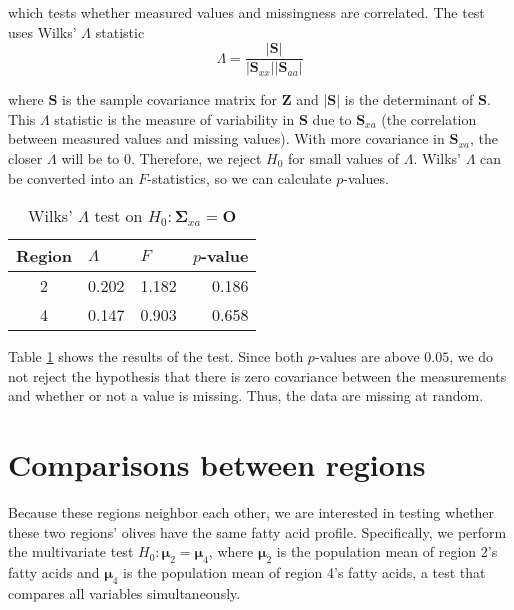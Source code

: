 \documentclass[11pt]{article}
\newcommand{\m}[1]{\mathbf{\bm{#1}}}
\begin{document}
\noindent which tests whether measured values and missingness are correlated. The test uses Wilks' $\Lambda$ statistic
\vspace{-3mm}
\[\Lambda=\frac{|\m{S}|}{|\m{S}_{xx}||\m{S}_{aa}|}\]
\vspace{-6mm}

\noindent where $\m{S}$ is the sample covariance matrix for $\m{Z}$ and $|\m{S}|$ is the determinant of $\m{S}$. This $\Lambda$ statistic is the measure of variability in $\m{S}$ due to $\m{S}_{xa}$ (the correlation between measured values and missing values). With more covariance in $\m{S}_{xa}$, the closer $\Lambda$ will be to $0$. Therefore, we reject $H_0$ for small values of $\Lambda$. Wilks' $\Lambda$ can be converted into an $F$-statistics, so we can calculate $p$-values.

\begin{table}[ht]
\begin{center}
\begin{tabular}{c | rrr}
Region & \multicolumn{1}{l}{$\Lambda$}  & \multicolumn{1}{l}{$F$}    & \multicolumn{1}{l}{$p$-value} \\ \hline \hline
     2 & 0.202 & 1.182  & 0.186     \\
     4 & 0.147 & 0.903  & 0.658     \\
\end{tabular}
\caption{Wilks' $\Lambda$ test on $H_0:\m{\Sigma}_{xa}=\m{O}$}
\label{missing}
\end{center}
\end{table}
\vspace{-6mm}

Table \ref{missing} shows the results of the test. Since both $p$-values are above $0.05$, we do not reject the hypothesis that there is zero covariance between the measurements and whether or not a value is missing. Thus, the data are missing at random.
\vspace{-4mm}

\section*{Comparisons between regions}
\vspace{-4mm}
Because these regions neighbor each other, we are interested in testing whether these two regions' olives have the same fatty acid profile. Specifically, we perform the multivariate test $H_0: \m{\mu}_2 = \m{\mu}_4$, where $\m{\mu}_2$ is the population mean of region 2's fatty acids and $\m{\mu}_4$ is the population mean of region 4's fatty acids, a test that compares all variables simultaneously.
\end{document}
